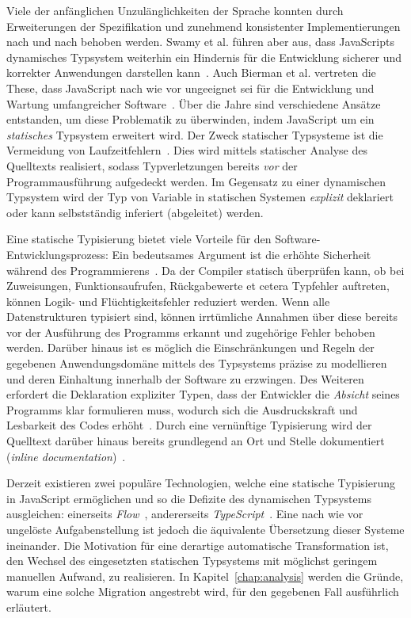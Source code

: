 Viele der anfänglichen Unzulänglichkeiten der Sprache konnten durch Erweiterungen der Spezifikation und zunehmend konsistenter Implementierungen nach und nach behoben werden. Swamy et al. führen aber aus, dass JavaScripts dynamisches Typsystem weiterhin ein Hindernis für die Entwicklung sicherer und korrekter Anwendungen darstellen kann~\autocite{NIKHIL:2014}. Auch Bierman et al. vertreten die These, dass JavaScript nach wie vor ungeeignet sei für die Entwicklung und Wartung umfangreicher Software~\autocite{BIERMAN:2014}. Über die Jahre sind verschiedene Ansätze entstanden, um diese Problematik zu überwinden, indem JavaScript um ein \emph{statisches} Typsystem erweitert wird. Der Zweck statischer Typsysteme ist die Vermeidung von Laufzeitfehlern~\autocite[1]{CARDELLI:TYPE_SYSTEMS}. Dies wird mittels statischer Analyse des Quelltexts realisiert, sodass Typverletzungen bereits \emph{vor} der Programmausführung aufgedeckt werden. Im Gegensatz zu einer dynamischen Typsystem wird der Typ von Variable in statischen Systemen \emph{explizit} deklariert oder kann selbstständig inferiert (abgeleitet) werden.

Eine statische Typisierung bietet viele Vorteile für den Software-Entwicklungsprozess: Ein bedeutsames Argument ist die erhöhte Sicherheit während des Programmierens~\autocite{CORNELL:STRONG_TYPING}. Da der Compiler statisch überprüfen kann, ob bei Zuweisungen, Funktionsaufrufen, Rückgabewerte et cetera Typfehler auftreten, können Logik- und Flüchtigkeitsfehler reduziert werden. Wenn alle Datenstrukturen typisiert sind, können irrtümliche Annahmen über diese bereits vor der Ausführung des Programms erkannt und zugehörige Fehler behoben werden. Darüber hinaus ist es möglich die Einschränkungen und Regeln der gegebenen Anwendungsdomäne mittels des Typsystems präzise zu modellieren und deren Einhaltung innerhalb der Software zu erzwingen. Des Weiteren erfordert die Deklaration expliziter Typen, dass der Entwickler die \emph{Absicht} seines Programms klar formulieren muss, wodurch sich die Ausdruckskraft und Lesbarkeit des Codes erhöht~\autocite[96]{WALDMANN:PPS}. Durch eine vernünftige Typisierung wird der Quelltext darüber hinaus bereits grundlegend an Ort und Stelle dokumentiert (\textit{inline documentation})~\autocite[Abschn. 6.1.1]{MITCHELL:CONCEPTS}.

Derzeit existieren zwei populäre Technologien, welche eine statische Typisierung in JavaScript ermöglichen und so die Defizite des dynamischen Typsystems ausgleichen: einerseits \textit{Flow}~\autocite{FLOW:PAPER}, andererseits \textit{TypeScript}~\autocite{TYPESCRIPT:SPEC}. Eine nach wie vor ungelöste Aufgabenstellung ist jedoch die äquivalente Übersetzung dieser Systeme ineinander. Die Motivation für eine derartige automatische Transformation ist, den Wechsel des eingesetzten statischen Typsystems mit möglichst geringem manuellen Aufwand, zu realisieren. In Kapitel~\ref{chap:analysis} werden die Gründe, warum eine solche Migration angestrebt wird, für den gegebenen Fall ausführlich erläutert.

